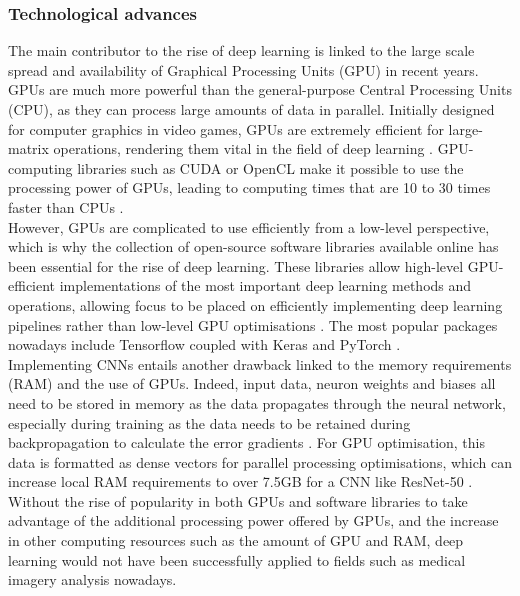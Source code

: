 \subsubsection{Technological advances}

The main contributor to the rise of deep learning is linked to the large scale spread and availability of  Graphical Processing Units (GPU) in recent years. GPUs are much more powerful than the general-purpose Central Processing Units (CPU), as they can process large amounts of data in parallel. Initially designed for computer graphics in video games, GPUs are extremely efficient for large-matrix operations, rendering them vital in the field of deep learning \citep{Caulfield2009}. GPU-computing libraries such as CUDA or OpenCL make it possible to use the processing power of GPUs, leading to computing times that are 10 to 30 times faster than CPUs \citep{Litjens2017}.\\

However, GPUs are complicated to use efficiently from a low-level perspective, which is why the collection of open-source software libraries available online has been essential for the rise of deep learning. These libraries allow high-level GPU-efficient implementations of the most important deep learning methods and operations, allowing focus to be placed on efficiently implementing deep learning pipelines rather than low-level GPU optimisations \citep{Litjens2017}. The most popular packages nowadays include Tensorflow \citep{tensorflow2015-whitepaper} coupled with Keras \citep{chollet2015keras} and PyTorch \citep{pytorch}.\\

Implementing CNNs entails another drawback linked to the memory requirements (RAM) and the use of GPUs. Indeed, input data, neuron weights and biases all need to be stored in memory as the data propagates through the neural network, especially during training as the data needs to be retained during backpropagation to calculate the error gradients \citep{Geron2019}. For GPU optimisation, this data is formatted as dense vectors for parallel processing optimisations, which can increase local RAM requirements to over 7.5GB for a CNN like ResNet-50 \citep{Hanlon2016}.\\

Without the rise of popularity in both GPUs and software libraries to take advantage of the additional processing power offered by GPUs, and the increase in other computing resources such as the amount of GPU and RAM, deep learning would not have been successfully applied to fields such as medical imagery analysis nowadays.

